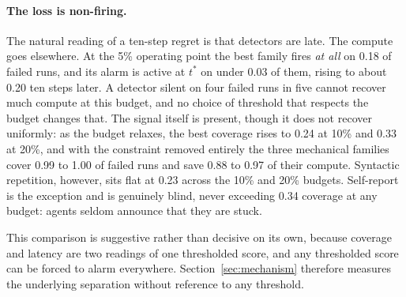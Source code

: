 \documentclass[sigconf,screen]{acmart}
\begin{document}
\paragraph{The loss is non-firing.} The natural reading of a ten-step regret is that detectors are
late. The compute goes elsewhere. At the 5\% operating point the best family fires
\emph{at all} on 0.18 of failed runs, and its alarm is active at $t^{*}$ on under 0.03 of them,
rising to about 0.20 ten steps later. A detector silent on four failed runs in five cannot recover
much compute at this budget, and no choice of threshold that respects the budget changes that. The
signal itself is present, though it does not recover uniformly: as the budget relaxes, the best
coverage rises to 0.24 at 10\% and 0.33 at 20\%, and with the constraint removed entirely the three
mechanical families cover 0.99 to 1.00 of failed runs and save 0.88 to 0.97 of their compute.
Syntactic repetition, however, sits flat at 0.23 across the 10\% and 20\% budgets. Self-report is the exception and is genuinely blind, never
exceeding 0.34 coverage at any budget: agents seldom announce that they are stuck.

This comparison is suggestive rather than decisive on its own, because coverage and latency are two
readings of one thresholded score, and any thresholded score can be forced to alarm everywhere.
Section~\ref{sec:mechanism} therefore measures the underlying separation without reference to any
threshold.
\end{document}
